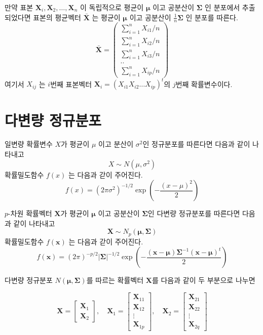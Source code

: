 \documentclass[
]{book}
\theoremstyle{definition}
\theoremstyle{definition}
\theoremstyle{definition}
\theoremstyle{remark}
\begin{document}
만약 표본 \(\bm X_i, \bm X_2, \dots, \bm X_n\) 이 독립적으로 평균이 \(\bm \mu\) 이고 공분산이 \(\bm \Sigma\)
인 분포에서 추출되었다면 표본의 평균벡터 \(\bar {\bm X}\) 는 평균이 \(\bm \mu\) 이고 공분산이 \(\frac{1}{n}\bm \Sigma\)
인 분포를 따른다.
\begin{equation*}
\bar {\bm X} =
  \begin{pmatrix}
\sum_{i=1}^n X_{i1} / n  \\
\sum_{i=1}^n X_{i2} / n \\
\sum_{i=1}^n X_{i3} / n \\
..  \\
\sum_{i=1}^n X_{ip} / n 
\end{pmatrix}
\end{equation*}
여기서 \(X_{ij}\) 는 \(i\)번째 표본벡터 \(\bm X_i =(X_{i1} X_{i2} \dots X_{ip})^t\)의 \(j\)번째 확률변수이다.

\hypertarget{uxb2e4uxbcc0uxb7c9-uxc815uxaddcuxbd84uxd3ec}{%
\section{다변량 정규분포}\label{uxb2e4uxbcc0uxb7c9-uxc815uxaddcuxbd84uxd3ec}}

일변량 확률변수 \(X\)가 평균이 \(\mu\) 이고 분산이 \(\sigma^2\)인 정규분포를 따른다면 다음과 같이 나타내고 \[ X \sim N(\mu, \sigma^2 ) \]
확률밀도함수 \(f(x)\) 는 다음과 갇이 주어진다.
\[ f(x) = (2 \pi \sigma^2)^{-1/2} \exp \left ( - \frac{(x-\mu)^2}{2} \right ) \]

\(p\)-차원 확률벡터 \(\bm X\)가 평균이 \(\bm \mu\) 이고 공분산이 \(\bm \Sigma\)인
다변량 정규분포를 따른다면 다음과 같이 나타내고 \[ \bm X \sim N_p(\bm \mu, \bm \Sigma ) \]
확률밀도함수 \(f(\bm x)\) 는 다음과 갇이 주어진다.
\[ f(\bm x) = (2 \pi)^{-p/2} | \bm \Sigma|^{-1/2} 
   \exp \left ( - \frac{(\bm x-\bm \mu) \bm \Sigma^{-1}(\bm x-\bm \mu)^t}{2} \right ) \]

다변량 정규분포 \(N(\bm \mu, \bm \Sigma)\)를 따르는 확률벡터 \(\bm X\)를 다음과 같이 두 부분으로 나누면

\[ 
  \bm X = 
    \begin{bmatrix}
  \bm X_1 \\
  \bm X_2
  \end{bmatrix}, \quad
  \bm X_1 = 
    \begin{bmatrix}
  \bm X_{11} \\
  \bm X_{12} \\
  \bm \vdots \\
  \bm X_{1p}
  \end{bmatrix}, \quad 
  \bm X_2= 
    \begin{bmatrix}
  \bm X_{21} \\
  \bm X_{22} \\
  \bm \vdots \\
  \bm X_{2q}
  \end{bmatrix}
  \]
\end{document}
